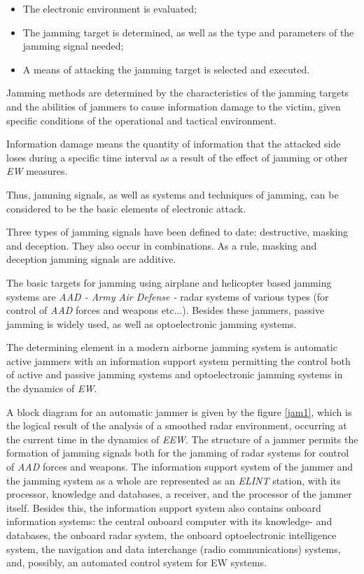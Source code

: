 \documentclass[english,purist]{ist-report}
\begin{document}
\begin{itemize}
    \item The electronic environment is evaluated; 
    \item The jamming target is determined, as well as the type and
parameters of the jamming signal needed; 
    \item A means of attacking the jamming target is selected and executed. 
\end{itemize}

Jamming methods are determined by the characteristics of the jamming
targets and the abilities of jammers to cause information damage to the victim, given specific conditions of the operational and tactical environment. 

Information damage means the quantity of information that the attacked side loses during a specific time interval as a result of the effect of jamming or other \textit{EW} measures. 

Thus, jamming signals, as well as systems and techniques of jamming,
can be considered to be the basic elements of electronic attack.

Three types of jamming signals have been defined to date: destructive,
masking and deception. They also occur in combinations. As a rule, masking and deception jamming signals are additive. 

The basic targets for jamming using airplane and helicopter based jamming systems are \textit{AAD - Army Air Defense -} radar systems of various types (for control of \textit{AAD} forces and weapons etc...).
Besides these jammers, passive jamming is widely used, as well as optoelectronic jamming systems.

The determining element in a modern airborne jamming system is
automatic active jammers with an information support system permitting the control both of active and passive jamming systems and optoelectronic jamming systems in the dynamics of \textit{EW}.

A block diagram for an automatic jammer is given by the figure \ref{jam1}, which is the logical result of the analysis of a smoothed radar environment, occurring at the current time in the dynamics of \textit{EEW}. The structure of a jammer permits the
formation of jamming signals both for the jamming of radar systems for
control of \textit{AAD} forces and weapons. The information support system of the jammer and the jamming system as a whole are represented as an \textit{ELINT} station, with its processor, knowledge and databases, a receiver, and the processor of the jammer itself. Besides this, the information support system also contains onboard information systems: the central onboard computer with its knowledge- and databases, the onboard radar system, the onboard optoelectronic intelligence system, the navigation and data interchange (radio communications) systems, and, possibly, an automated control system for EW systems. 
\end{document}

